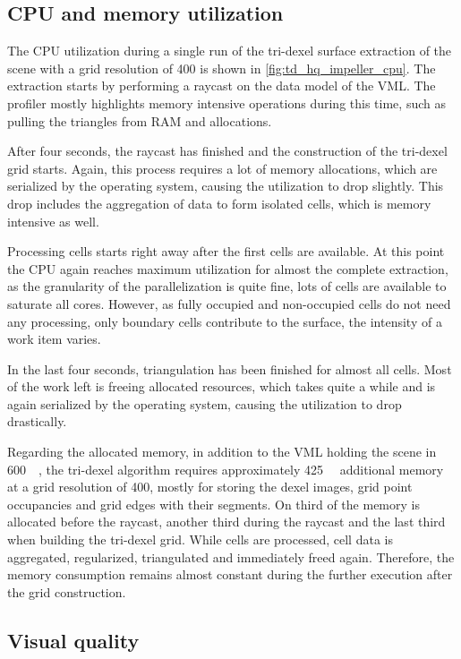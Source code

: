 \subsection{CPU and memory utilization}
\label{sec:tri_dexel_utilization}

The CPU utilization during a single run of the tri-dexel surface extraction of the \impeller scene with a grid resolution of 400 is shown in \cref{fig:td_hq_impeller_cpu}.
The extraction starts by performing a raycast on the data model of the VML.
The profiler mostly highlights memory intensive operations during this time, such as pulling the triangles from RAM and allocations.

After four seconds, the raycast has finished and the construction of the tri-dexel grid starts.
Again, this process requires a lot of memory allocations, which are serialized by the operating system, causing the utilization to drop slightly.
This drop includes the aggregation of data to form isolated cells, which is memory intensive as well.

Processing cells starts right away after the first cells are available.
At this point the CPU again reaches maximum utilization for almost the complete extraction, as the granularity of the parallelization is quite fine, \ie lots of cells are available to saturate all cores.
However, as fully occupied and non-occupied cells do not need any processing, only boundary cells contribute to the surface, the intensity of a work item varies.

In the last four seconds, triangulation has been finished for almost all cells.
Most of the work left is freeing allocated resources, which takes quite a while and is again serialized by the operating system, causing the utilization to drop drastically.

Regarding the allocated memory, in addition to the VML holding the \impeller scene in \SI{600}{\mebi\byte}, the tri-dexel algorithm requires approximately \SI{425}{\mebi\byte} additional memory at a grid resolution of 400, mostly for storing the dexel images, grid point occupancies and grid edges with their segments.
On third of the memory is allocated before the raycast, another third during the raycast and the last third when building the tri-dexel grid.
While cells are processed, cell data is aggregated, regularized, triangulated and immediately freed again.
Therefore, the memory consumption remains almost constant during the further execution after the grid construction.


\subsection{Visual quality}

